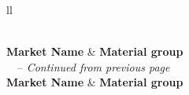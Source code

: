 \documentclass{article}
\begin{document}
\begin{longtable}{ll}
    \caption{A comprehensive list of various materials and their groupings in the default configuration}\label{tab:list_materials} \\
    \toprule
    \textbf{Market Name}       & \textbf{Material group}                                                                           \\
    \midrule
    \endfirsthead
    {\tablename\ \thetable\ -- \textit{Continued from previous page}}                                                              \\
    \toprule
    \textbf{Market Name}       & \textbf{Material group}                                                                           \\
    \midrule
    \endhead
    \midrule {}                                                                   \\
    \endfoot
    \bottomrule
    \endlastfoot


\end{longtable}
\end{document}
